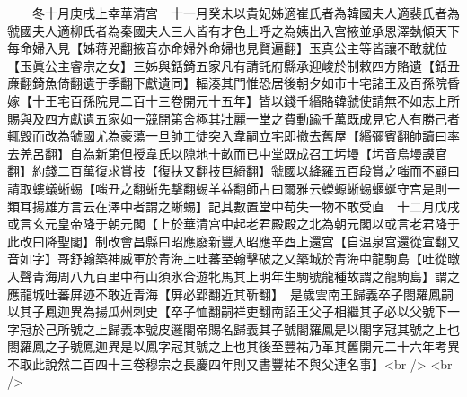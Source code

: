 　　冬十月庚戌上幸華清宫　十一月癸未以貴妃姊適崔氏者為韓國夫人適裴氏者為虢國夫人適柳氏者為秦國夫人三人皆有才色上呼之為姨出入宫掖並承恩澤埶傾天下每命婦入見【姊蒋兕翻掖音亦命婦外命婦也見賢遍翻】玉真公主等皆讓不敢就位【玉眞公主睿宗之女】三姊與銛錡五家凡有請託府縣承迎峻於制敕四方賂遺【銛丑亷翻錡魚倚翻遺于季翻下獻遺同】輻湊其門惟恐居後朝夕如市十宅諸王及百孫院昏嫁【十王宅百孫院見二百十三卷開元十五年】皆以錢千緡賂韓虢使請無不如志上所賜與及四方獻遺五家如一競開第舍極其壯麗一堂之費動踰千萬既成見它人有勝己者輒毁而改為虢國尤為豪蕩一旦帥工徒突入韋嗣立宅即撤去舊屋【緡彌賓翻帥讀曰率去羌呂翻】自為新第但授韋氏以隙地十畝而已中堂既成召工圬墁【圬音烏墁謨官翻】約錢二百萬復求賞技【復扶又翻技巨綺翻】虢國以絳羅五百段賞之嗤而不顧曰請取螻蟻蜥蜴【嗤丑之翻蜥先撃翻蜴羊益翻師古曰爾雅云蠑螈蜥蜴蝘蜒守宫是則一類耳揚雄方言云在澤中者謂之蜥蜴】記其數置堂中苟失一物不敢受直　十二月戊戌或言玄元皇帝降于朝元閣【上於華清宫中起老君殿殿之北為朝元閣以或言老君降于此改曰降聖閣】制改會昌縣曰昭應廢新豐入昭應辛酉上還宫【自温泉宫還從宣翻又音如字】哥舒翰築神威軍於青海上吐蕃至翰擊破之又築城於青海中龍駒島【吐從暾入聲青海周八九百里中有山須氷合遊牝馬其上明年生駒號龍種故謂之龍駒島】謂之應龍城吐蕃屏迹不敢近青海【屏必郢翻近其靳翻】　是歲雲南王歸義卒子閤羅鳳嗣以其子鳳迦異為揚瓜州刺史【卒子恤翻嗣祥吏翻南詔王父子相繼其子必以父號下一字冠於己所號之上歸義本號皮邏閤帝賜名歸義其子號閤羅鳳是以閤字冠其號之上也閤羅鳳之子號鳳迦異是以鳳字冠其號之上也其後至豐祐乃革其舊開元二十六年考異不取此說然二百四十三卷穆宗之長慶四年則又書豐祐不與父連名事】<br />
<br />
